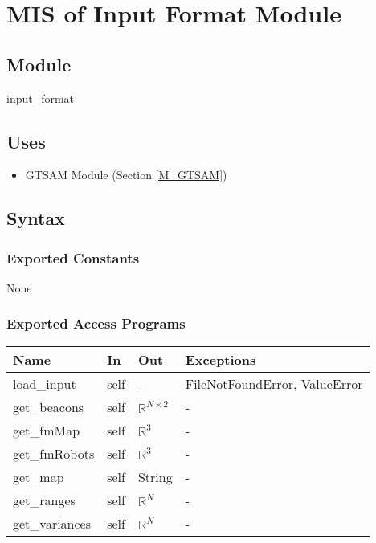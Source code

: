 \documentclass[12pt, titlepage]{article}
\begin{document}

\newpage

\section{MIS of Input Format Module} \label{M_Input} 



\subsection{Module}

input\_format

\subsection{Uses}
\begin{itemize}
  \item GTSAM Module (Section \ref{M_GTSAM})
\end{itemize}

\subsection{Syntax}

\subsubsection{Exported Constants}
None
\subsubsection{Exported Access Programs}

\begin{center}
\begin{tabular}{p{3cm} p{2cm} p{2cm} p{4cm}}
\hline
\textbf{Name} & \textbf{In} & \textbf{Out} & \textbf{Exceptions} \\
\hline
load\_input & self & -& FileNotFoundError, ValueError \\
get\_beacons& self & $\mathbb{R}^{N \times 2}$ & - \\
get\_fmMap& self & $\mathbb{R}^3$ & - \\
get\_fmRobots& self & $\mathbb{R}^3$ & - \\
get\_map& self & String & - \\
get\_ranges& self & $\mathbb{R}^N$ & - \\
get\_variances& self & $\mathbb{R}^N$ & - \\
\hline
\end{tabular}
\end{center}
\end{document}
